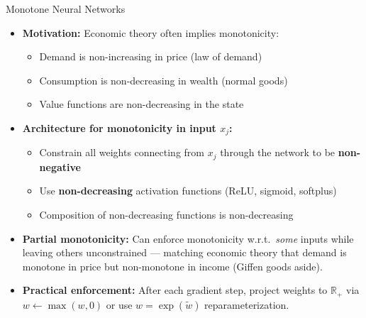 \documentclass[10pt,english,aspectratio=169]{beamer}
\begin{document}
\begin{frame}{Monotone Neural Networks}
\begin{itemize}
\item \textbf{Motivation:} Economic theory often implies monotonicity:
\begin{itemize}
\item Demand is non-increasing in price (law of demand)
\item Consumption is non-decreasing in wealth (normal goods)
\item Value functions are non-decreasing in the state
\end{itemize}

\medskip
\item \textbf{Architecture for monotonicity in input $x_j$:}
\begin{itemize}
\item Constrain all weights connecting from $x_j$ through the network to be \textbf{non-negative}
\item Use \textbf{non-decreasing} activation functions (ReLU, sigmoid, softplus)
\item Composition of non-decreasing functions is non-decreasing
\end{itemize}

\medskip
\item \textbf{Partial monotonicity:} Can enforce monotonicity w.r.t.\ \emph{some} inputs while leaving others unconstrained --- matching economic theory that demand is monotone in price but non-monotone in income (Giffen goods aside).

\medskip
\item \textbf{Practical enforcement:} After each gradient step, project weights to $\mathbb{R}_+$ via $w \leftarrow \max(w, 0)$ or use $w = \exp(\tilde{w})$ reparameterization.
\end{itemize}
\end{frame}
\end{document}
